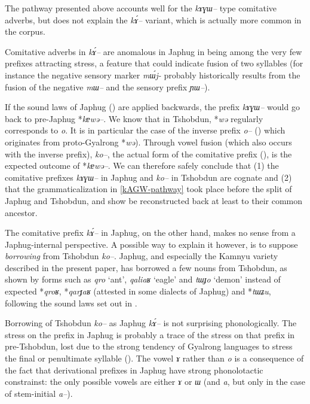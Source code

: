 \documentclass[oldfontcommands,oneside,a4paper,11pt]{article}
\newcommand{\ipa}[1]{{\phon\textit{#1}}} %
\begin{document}
The pathway presented above accounts well for the \ipa{kɤɣɯ--} type comitative adverbs, but does not explain the \ipa{kɤ́--} variant, which is actually more common in the corpus.

Comitative adverbs in \ipa{kɤ́--} are anomalous in Japhug in being among the very few prefixes attracting stress, a feature that could indicate fusion of two syllables (for instance the negative sensory marker \ipa{mɯ́j-} probably historically results from the fusion of the negative \ipa{mɯ--} and the sensory prefix \ipa{ɲɯ--}).

If the sound laws of Japhug (\citealt{jacques04these}) are applied backwards, the prefix \ipa{kɤɣɯ--} would go back to pre-Japhug *\ipa{kɐwə--}. We know that in Tshobdun, *\ipa{wə} regularly corresponds to \ipa{o}. It is in particular the case of the inverse prefix \ipa{o--} (\citealt{jackson02rentongdengdi}) which originates from proto-Gyalrong *\ipa{wə}). Through vowel fusion (which also occurs with the inverse prefix), \ipa{ko--}, the actual form of the comitative prefix (\citealt[107]{jackson98morphology}), is the expected outcome of *\ipa{kɐwə--}. We can therefore safely conclude that (1) the comitative prefixes \ipa{kɤɣɯ--} in Japhug and \ipa{ko--} in Tshobdun are cognate and (2) that the grammaticalization in \ref{kAGW-pathway} took place before the split of Japhug and Tshobdun, and show be reconstructed back at least to their common ancestor.

The comitative prefix \ipa{kɤ́--} in Japhug, on the other hand, makes no sense from a Japhug-internal perspective. A possible way to explain it however, is to suppose \textit{borrowing} from Tshobdun \ipa{ko--}. Japhug, and especially the Kamnyu variety described in the present paper, has borrowed a few nouns from Tshobdun, as shown by forms such as \ipa{qro} `ant', \ipa{qaliaʁ} `eagle' and \ipa{tɯɟo} `demon' instead of expected *\ipa{qroʁ}, *\ipa{qarɟaʁ} (attested in some dialects of Japhug) and *\ipa{tɯʑu}, following the sound laws set out in \citet{jacques04these}.

Borrowing of Tshobdun \ipa{ko--} as Japhug \ipa{kɤ́--} is not surprising phonologically. The stress on the prefix in Japhug is probably a trace of the stress on that prefix in pre-Tshobdun, lost due to the strong tendency of Gyalrong languages to stress the final or penultimate syllable (\citealt{jackson05yingao}). The vowel \ipa{ɤ} rather than \ipa{o} is a consequence of the fact that derivational prefixes in Japhug have strong phonolotactic constrainst: the only possible vowels are either \ipa{ɤ} or \ipa{ɯ} (and \ipa{a}, but only in the case of stem-initial \ipa{a--}).
\end{document}

